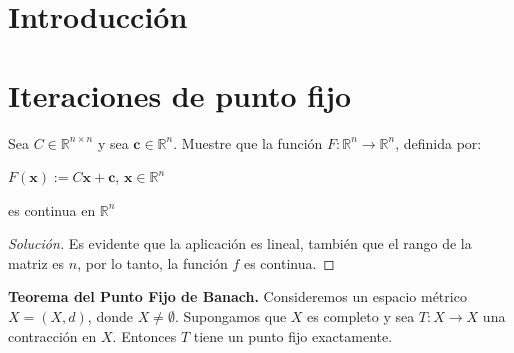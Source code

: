 \documentclass[12pt]{book}
\newcommand{\R}{\mathbb{R}}
\newenvironment{solucion}
  {\renewcommand\qedsymbol{$\square$}\begin{proof}[Solución]}
  {\end{proof}}
\begin{document}
\section{Introducción}
\section{Iteraciones de punto fijo}
\eje Sea $C\in\R^{n\times n}$ y sea $\textbf{c}\in\R^{n}$. Muestre que la función $F:\R^n\rightarrow \R^n$, definida por:

\begin{center}
    $F(\textbf{x}):=C\textbf{x}+\textbf{c}$, $\textbf{x}\in\R^{n} $
\end{center}
 es continua en $\R^{n}$
 \begin{solucion}
    Es evidente que la aplicación es lineal, también que el rango de la matriz es $n$, por lo tanto, la función $f$ es continua.
 \end{solucion}
\eje \textbf{Teorema del Punto Fijo de Banach.} Consideremos un espacio métrico $X=(X,d)$, donde $X\ne\emptyset$. Supongamos que $X$ es completo y sea $T:X\to X$ una contracción en $X$. Entonces $T$ tiene un punto fijo exactamente.
\end{document}
